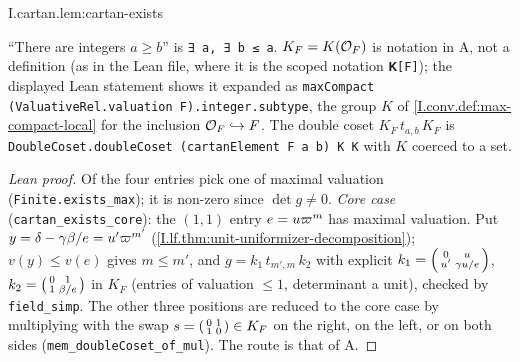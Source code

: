 \begin{lemma}
\end{lemma}
\begin{tfformal}{I.cartan.lem:cartan-exists}
\begin{tffidelity}
``There are integers $a\ge b$'' is \texttt{∃ a, ∃ b ≤ a}. $K_F=K(\mathcal{O}_F)$ is notation in A, not a definition (as in the Lean file, where it is the scoped notation \texttt{𝐊[F]}); the displayed Lean statement shows it expanded as \texttt{maxCompact (ValuativeRel.valuation F).integer.subtype}, the group $K$ of \cref{I.conv.def:max-compact-local} for the inclusion $\mathcal{O}_F\hookrightarrow F$. The double coset $K_F\,t_{a,b}\,K_F$ is \texttt{DoubleCoset.doubleCoset (cartanElement F a b) K K} with $K$ coerced to a set.
\end{tffidelity}
\end{tfformal}
\begin{proof}[Lean proof]
Of the four entries pick one of maximal valuation (\texttt{Finite.exists\_max}); it is non-zero since $\det g\neq0$. \emph{Core case} (\texttt{cartan\_exists\_core}): the $(1,1)$ entry $e=u\varpi^m$ has maximal valuation. Put $y=\delta-\gamma\beta/e=u'\varpi^{m'}$ (\cref{I.lf.thm:unit-uniformizer-decomposition}); $v(y)\le v(e)$ gives $m\le m'$, and $g=k_1\,t_{m',m}\,k_2$ with explicit $k_1=\begin{psmallmatrix}0&u\\u'&\gamma u/e\end{psmallmatrix}$, $k_2=\begin{psmallmatrix}0&1\\1&\beta/e\end{psmallmatrix}$ in $K_F$ (entries of valuation $\le1$, determinant a unit), checked by \texttt{field\_simp}. The other three positions are reduced to the core case by multiplying with the swap $s=\begin{psmallmatrix}0&1\\1&0\end{psmallmatrix}\in K_F$ on the right, on the left, or on both sides (\texttt{mem\_doubleCoset\_of\_mul}). The route is that of A.
\end{proof}

